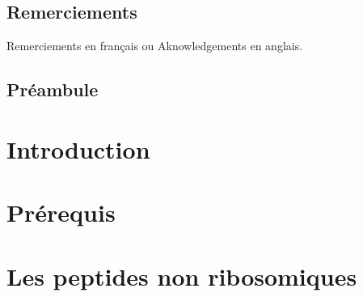 \documentclass[12pt]{LHSV_thesis}
\begin{document}
\section*{\Huge Remerciements}
%
\vspace{2cm}

Remerciements en français ou  Aknowledgements en anglais.

\clearpage


\tableofcontents
\clearpage





\section*{Préambule}
\label{preambule}
%


\chapter*{Introduction}
\label{Introduction}



\chapter*{Prérequis}
\label{prerequis}



\chapter[Les peptides non ribosomiques]{Les peptides non ribosomiques}
\label{Chapter1}
\end{document}
